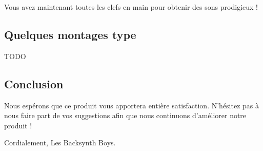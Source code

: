 \documentclass[a4paper,oneside,frenchb,12pt]{article}
\begin{document}
Vous avez maintenant toutes les clefs en main pour obtenir des sons
prodigieux !

\subsection{Quelques montages type}

TODO

\subsection{Conclusion}

Nous espérons que ce produit vous apportera entière satisfaction.
N'hésitez pas à nous faire part de vos suggestions afin que nous
continuons d'améliorer notre produit !

Cordialement, Les Backsynth Boys.
\end{document}
